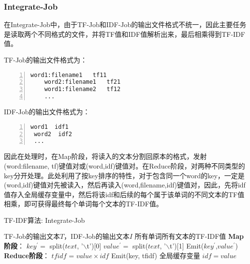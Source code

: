 \documentclass[lang=cn,11pt]{elegantpaper}
\begin{document}
\subsubsection{Integrate-Job}
在Integrate-Job中，由于TF-Job和IDF-Job的输出文件格式不统一，因此主要任务是读取两个不同格式的文件，并将TF值和IDF值解析出来，最后相乘得到TF-IDF值。\par
TF-Job的输出文件格式为：
  \begin{lstlisting}[language={[ANSI]C},numbers=left,numberstyle=\tiny,%frame=shadowbox,  
     rulesepcolor=\color{red!20!green!20!blue!20},  
     keywordstyle=\color{blue!70!black},  
     commentstyle=\color{blue!90!},  
     basicstyle=\ttfamily]  
    word1:filename1   tf11
    word2:filename1   tf21
    word1:filename2   tf12
    ...
  \end{lstlisting}\par
IDF-Job的输出文件格式为：
\begin{lstlisting}[language={[ANSI]C},numbers=left,numberstyle=\tiny,%frame=shadowbox,  
  rulesepcolor=\color{red!20!green!20!blue!20},  
  keywordstyle=\color{blue!70!black},  
  commentstyle=\color{blue!90!},  
  basicstyle=\ttfamily]  
 word1  idf1
 word2  idf2
 ...
\end{lstlisting}\par
因此在处理时，在Map阶段，将读入的文本分割回原本的格式，发射(word:filename, tf)键值对或(word,idf)键值对。在Reduce阶段，对两种不同类型的key分开处理。此处利用了按key排序的特性，对于包含同一个word的key，一定是(word,idf)键值对先被读入，然后再读入(word,filename,idf)键值对，因此，先将idf值存入全局缓存变量中，然后将该idf和后续的每个属于该单词的不同文本的TF值相乘，即可获得最终每个单词每个文本的TF-IDF值。\par
\begin{algorithm}[htb]  
  \caption{TF-IDF算法: Integrate-Job}  
  \label{alg:Framwork}
  \begin{algorithmic}[1]
    \Require
    TF-Job的输出文本$T$，IDF-Job的输出文本$I$
    \Ensure
    所有单词所有文本的TF-IDF值
    \State \textbf{Map阶段}：
      \State $key^\prime=$ split($text$, '$\backslash$t')[0]
      \State $value^\prime=$ split($text$, '$\backslash$t')[1]
      \State Emit($key^\prime$,$value^\prime$)
    \EndFunction
    \State \textbf{Reduce阶段}：
        \State $tfidf$ = $value\times idf$
        \State Emit(key, tfidf)
      \Else
        \State 全局缓存变量 $idf=value$
      \EndIf
    \EndFunction
  \end{algorithmic}
\end{algorithm}
\end{document}

